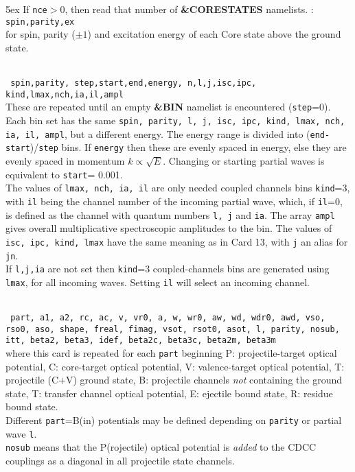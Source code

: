 \documentclass[11pt]{article}
\begin{document}
\hangindent 5ex
If {\tt nce}$>$0, then read that number of {\bf
\&CORESTATES} namelists. : {\tt
spin,parity,ex }\\ for spin, parity ($\pm1$) and excitation energy of each Core
state above the ground state.

\\
{\tt
spin,parity, step,start,end,energy, n,l,j,isc,ipc, kind,lmax,nch,ia,il,ampl
}\\
These are repeated until an empty  {\bf \&BIN} namelist is encountered
({\tt step}=0).\\
Each bin set has the same {\tt spin, parity, l, j, isc, ipc, kind, lmax, nch, ia,
il, ampl}, but a different energy.
The energy range is divided into ({\tt end-start})/{\tt step} bins.
If {\tt energy} then these are evenly spaced in energy, else they
are evenly spaced in momentum $k \propto \sqrt{E}$.
Changing or starting partial waves is equivalent to {\tt start}= 0.001.
\\
The values of {\tt lmax, nch, ia, il} are only needed coupled channels bins
{\tt kind}=3, with {\tt il} being the channel number of the incoming partial wave,
which, if {\tt il}=0, is defined as the channel with quantum numbers
{\tt l, j} and {\tt ia}. The array {\tt ampl} gives overall multiplicative
spectroscopic amplitudes to the bin. The values of {\tt isc, ipc, kind, lmax}
have the same meaning as in Card 13, with {\tt j} an alias for {\tt jn}.\\
If {\tt l,j,ia} are not set then {\tt kind}=3 coupled-channels bins are generated
using {\tt lmax}, for all incoming waves. Setting {\tt il} will select an
incoming channel.

\\
{\tt
part, a1, a2, rc, ac, v, vr0, a, w, wr0, aw,
wd, wdr0, awd, vso, rso0, aso, shape, freal, fimag,
vsot, rsot0, asot, l, parity, nosub, itt,
beta2, beta3, idef, beta2c, beta3c, beta2m, beta3m
}\\
where this card is repeated for each {\tt part} beginning
P: projectile-target  optical potential, C: core-target optical potential,
V: valence-target  optical potential,
T: projectile (C+V) ground state,
B: projectile channels {\em not} containing the ground state,
T: transfer channel optical potential,
E: ejectile bound state, R: residue bound state.\\
Different {\tt part}=B(in) potentials may be defined depending on {\tt parity}
or partial wave {\tt l}. \\
{\tt nosub} means that the P(rojectile) optical potential is {\em added} to
the CDCC couplings as a diagonal in all projectile state channels.\\
\end{document}
